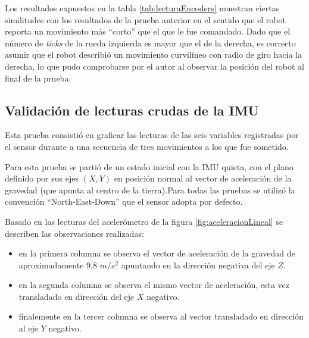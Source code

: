 Los resultados expuestos en la tabla \ref{tab:lecturaEncoders} muestran ciertas similitudes con los resultados de la prueba anterior en el sentido que el robot reporta un movimiento más ``corto'' que el que le fue comandado. Dado que el número de \textit{ticks} de la rueda izquierda es mayor que el de la derecha, es correcto asumir que el robot describió un movimiento curvilíneo con radio de giro hacia la derecha, lo que pudo comprobarse por el autor al observar la posición del robot al final de la prueba.

\subsection{Validación de lecturas crudas de la IMU}

Esta prueba consistió en graficar las lecturas de las seis variables registradas por el sensor durante a una secuencia de tres movimientos a los que fue sometido.

Para esta prueba se partió de un estado inicial con la IMU quieta, con el plano definido por sus ejes $(X,Y)$ en posición normal al vector de aceleración de la gravedad (que apunta al centro de la tierra).Para todas las pruebas se utilizó la convención ``North-East-Down'' \protect\footnotemark que el sensor adopta por defecto.


Basado en las lecturas del acelerómetro de la figura \ref{fig:aceleracionLineal} se describen las observaciones realizadas:

\begin{itemize}
    \item en la primera columna se observa el vector de aceleración de la gravedad de aproximadamente 9,8 $m/s^2$ apuntando en la dirección negativa del eje $Z$.
    \item en la segunda columna se observa el mismo vector de aceleración, esta vez transladado en dirección del eje $X$ negativo.
    \item finalemente en la tercer columna se observa al vector transladado en dirección al eje $Y$ negativo.
\end{itemize}


